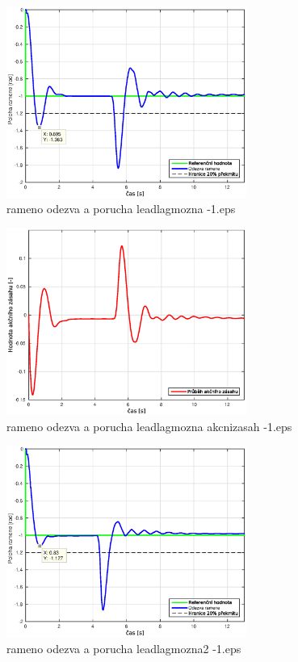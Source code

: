 \documentclass[11pt, a4paper]{article}
\begin{document}
\begin{figure}[H]
\centering
\includegraphics[width=0.7\textwidth]{dobre_grafy/rameno_odezva_a_porucha_leadlagmozna_-1.eps}
\caption{rameno odezva a porucha leadlagmozna -1.eps}
\label{ram_p_akc}
\end{figure}

\begin{figure}[H]
\centering
\includegraphics[width=0.7\textwidth]{dobre_grafy/rameno_odezva_a_porucha_leadlagmozna_akcnizasah_-1.eps}
\caption{rameno odezva a porucha leadlagmozna akcnizasah -1.eps}
\label{ram_p_akc}
\end{figure}




\begin{figure}[H]
\centering
\includegraphics[width=0.7\textwidth]{dobre_grafy/rameno_odezva_a_porucha_leadlagmozna2_-1.eps}
\caption{rameno odezva a porucha leadlagmozna2 -1.eps}
\label{ram_p_akc}
\end{figure}
\end{document}
